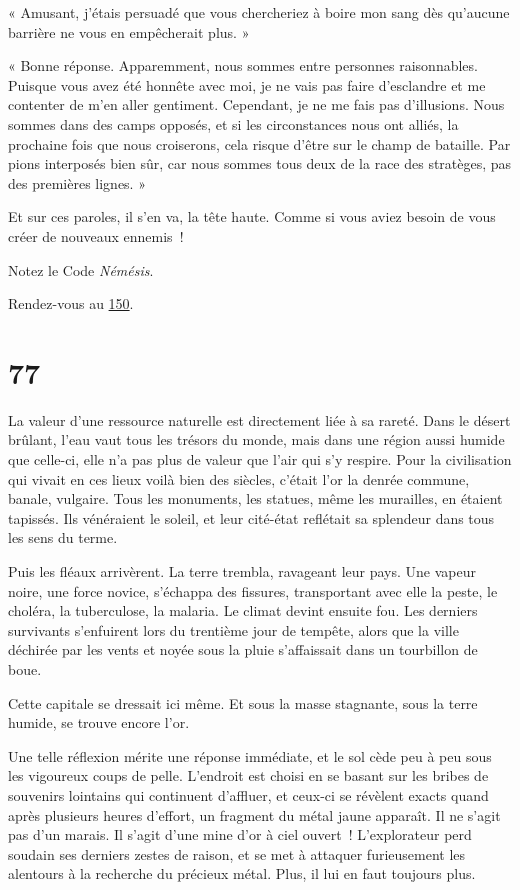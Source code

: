 \documentclass{report}
\newcommand{\gsection}[1]{
    \section{#1}
    \label{section-#1}
}
\newcommand{\glink}[1]{\hyperref[section-#1]{#1}}
\begin{document}
« Amusant, j'étais persuadé que vous chercheriez à boire mon sang dès qu'aucune barrière ne vous en empêcherait plus. »

« Bonne réponse. Apparemment, nous sommes entre personnes raisonnables. Puisque vous avez été honnête avec moi, je ne vais pas faire d'esclandre et me contenter de m'en aller gentiment. Cependant, je ne me fais pas d'illusions. Nous sommes dans des camps opposés, et si les circonstances nous ont alliés, la prochaine fois que nous croiserons, cela risque d'être sur le champ de bataille. Par pions interposés bien sûr, car nous sommes tous deux de la race des stratèges, pas des premières lignes. »

Et sur ces paroles, il s'en va, la tête haute. Comme si vous aviez besoin de vous créer de nouveaux ennemis !

Notez le Code \emph{Némésis}.

Rendez-vous au \glink{150}.

\gsection{77}

La valeur d'une ressource naturelle est directement liée à sa rareté. Dans le désert brûlant, l'eau vaut tous les trésors du monde, mais dans une région aussi humide que celle-ci, elle n'a pas plus de valeur que l'air qui s'y respire. Pour la civilisation qui vivait en ces lieux voilà bien des siècles, c'était l'or la denrée commune, banale, vulgaire. Tous les monuments, les statues, même les murailles, en étaient tapissés. Ils vénéraient le soleil, et leur cité-état reflétait sa splendeur dans tous les sens du terme.

Puis les fléaux arrivèrent. La terre trembla, ravageant leur pays. Une vapeur noire, une force novice, s'échappa des fissures, transportant avec elle la peste, le choléra, la tuberculose, la malaria. Le climat devint ensuite fou. Les derniers survivants s'enfuirent lors du trentième jour de tempête, alors que la ville déchirée par les vents et noyée sous la pluie s'affaissait dans un tourbillon de boue.

Cette capitale se dressait ici même. Et sous la masse stagnante, sous la terre humide, se trouve encore l'or.

Une telle réflexion mérite une réponse immédiate, et le sol cède peu à peu sous les vigoureux coups de pelle. L'endroit est choisi en se basant sur les bribes de souvenirs lointains qui continuent d'affluer, et ceux-ci se révèlent exacts quand après plusieurs heures d'effort, un fragment du métal jaune apparaît.
Il ne s'agit pas d'un marais. Il s'agit d'une mine d'or à ciel ouvert ! L'explorateur perd soudain ses derniers zestes de raison, et se met à attaquer furieusement les alentours à la recherche du précieux métal. Plus, il lui en faut toujours plus.
\end{document}
